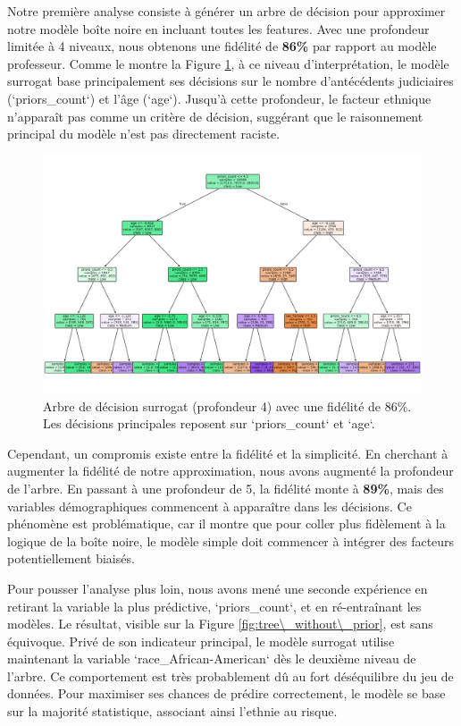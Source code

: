 \documentclass{article}
\begin{document}
\quad Notre première analyse consiste à générer un arbre de décision pour approximer notre modèle boîte noire en incluant toutes les features. Avec une profondeur limitée à 4 niveaux, nous obtenons une fidélité de \textbf{86\%} par rapport au modèle professeur. Comme le montre la Figure \ref{fig:tree_lvl4}, à ce niveau d'interprétation, le modèle surrogat base principalement ses décisions sur le nombre d'antécédents judiciaires (`priors\_count`) et l'âge (`age`). Jusqu'à cette profondeur, le facteur ethnique n'apparaît pas comme un critère de décision, suggérant que le raisonnement principal du modèle n'est pas directement raciste.

\begin{figure}[h!]
    \centering
    \includegraphics[width=\textwidth]{tree_with_lvl4.png}
    \caption{Arbre de décision surrogat (profondeur 4) avec une fidélité de 86\%. Les décisions principales reposent sur `priors\_count` et `age`.}
    \label{fig:tree_lvl4}
\end{figure}

\quad Cependant, un compromis existe entre la fidélité et la simplicité. En cherchant à augmenter la fidélité de notre approximation, nous avons augmenté la profondeur de l'arbre. En passant à une profondeur de 5, la fidélité monte à \textbf{89\%}, mais des variables démographiques commencent à apparaître dans les décisions. Ce phénomène est problématique, car il montre que pour coller plus fidèlement à la logique de la boîte noire, le modèle simple doit commencer à intégrer des facteurs potentiellement biaisés.

\quad Pour pousser l'analyse plus loin, nous avons mené une seconde expérience en retirant la variable la plus prédictive, `priors\_count`, et en ré-entraînant les modèles. Le résultat, visible sur la Figure \ref{fig:tree\_without\_prior}, est sans équivoque. Privé de son indicateur principal, le modèle surrogat utilise maintenant la variable `race\_African-American` dès le deuxième niveau de l'arbre. Ce comportement est très probablement dû au fort déséquilibre du jeu de données. Pour maximiser ses chances de prédire correctement, le modèle se base sur la majorité statistique, associant ainsi l'ethnie au risque.
\end{document}
